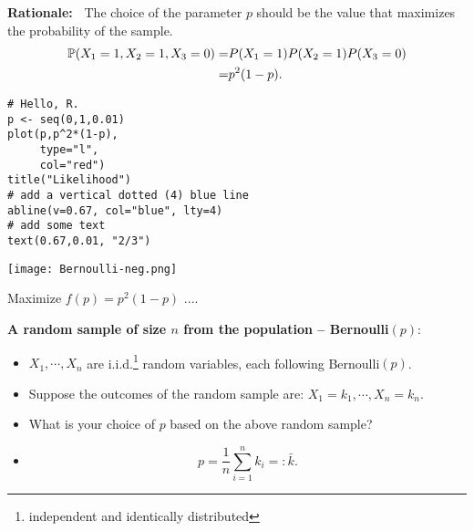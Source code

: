 \begin{frame}[fragile]

 {\bf\noindent Rationale:~} The choice of the parameter $p$ should be the value that maximizes the probability of the sample.
 \vfill
 \begin{align*}
 \mathbb{P}(X_1=1,X_2=1,X_3=0) = &
 P(X_1=1)P(X_2=1)P(X_3=0) \\
 = &p^2(1-p).
 \end{align*}
 \vfill
 \pause
\begin{minipage}{0.4\textwidth}
\begin{lstlisting}
# Hello, R.
p <- seq(0,1,0.01)
plot(p,p^2*(1-p),
     type="l",
     col="red")
title("Likelihood")
# add a vertical dotted (4) blue line
abline(v=0.67, col="blue", lty=4)
# add some text
text(0.67,0.01, "2/3")
 \end{lstlisting}
\end{minipage}
\hfill
\begin{minipage}{0.5\textwidth}
 \texttt{[image: Bernoulli-neg.png]}
\end{minipage}
\vfill
Maximize $f(p) = p^2(1-p)$ ....
\end{frame}
\begin{frame}[fragile]

{\bf A random sample of size $n$ from the population -- Bernoulli$(p)$}: \\[1em]
\begin{itemize}
 \item $X_1, \cdots, X_n$ are i.i.d.\footnote{independent and identically distributed} random variables, each following Bernoulli$(p)$. \\[1em]
 \item Suppose the outcomes of the random sample are: $X_1=k_1,\cdots,X_n=k_n$. \\[1em]
 \item What is your choice of $p$ based on the above random sample?
 \vfill
 \item[]
 \[
 p=\frac{1}{n} \sum_{i=1}^n k_i =: \bar{k}.
 \]
\end{itemize}

\end{frame}
